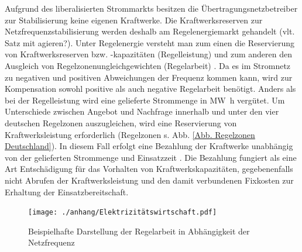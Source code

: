 		Aufgrund des liberalisierten Strommarkts besitzen die Übertragungsnetzbetreiber zur Stabilisierung keine eigenen Kraftwerke.
		Die Kraftwerksreserven zur Netzfrequenzstabilisierung werden deshalb am Regelenergiemarkt gehandelt (vlt. Satz mit agieren?).
		Unter Regelenergie versteht man zum einen die Reservierung von Kraftwerksreserven bzw. -kapazitäten (Regelleistung) und zum anderen den Ausgleich von Regelzonenungleichgewichten (Regelarbeit) \parencite{Elektrizitätswirtschaft}.
		Da es im Stromnetz zu negativen und positiven Abweichungen der Frequenz kommen kann, wird zur Kompensation sowohl positive als auch negative Regelarbeit benötigt.
		Anders als bei der Regelleistung wird eine gelieferte Strommenge in \si{\mega\watt\hour} vergütet.
		Um Unterschiede zwischen Angebot und Nachfrage innerhalb und unter den vier deutschen Regelzonen auszugleichen, wird eine Reservierung von Kraftwerksleistung erforderlich (Regelzonen s. Abb. \ref{Abb. Regelzonen Deutschland}). 
		In diesem Fall erfolgt eine Bezahlung der Kraftwerke unabhängig von der gelieferten Strommenge und Einsatzzeit \parencite{Elektrizitätswirtschaft}. 
		Die Bezahlung fungiert als eine Art Entschädigung für das Vorhalten von Kraftwerkskapazitäten, gegebenenfalls nicht Abrufen der Kraftwerksleistung und den damit verbundenen Fixkosten zur Erhaltung der Einsatzbereitschaft.   
		
		\begin{figure} [H]
			\centering
			\label{Abb. Beispielhafte Darstellung der Regelenergie in Abhängigkeit der Netzfrequenz}
			\texttt{[image: ./anhang/Elektrizitätswirtschaft.pdf]}
			\caption{Beispielhafte Darstellung der Regelarbeit in Abhängigkeit der Netzfrequenz \parencite{Elektrizitätswirtschaft}}
		\end{figure}
	
